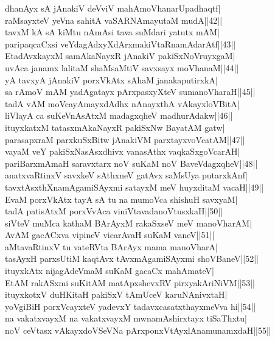 \documentclass{article}
\begin{document}
dhanAyx sA jAnakiV deVviV mahAmoVhanarUpadhaqtf|\\
raMsayxteV yeVna sahitA vaSARNAmayutaM mudA||42||\\
tavxM kA sA kiMtu nAmAsi tava suMdari yatutx mAM|\\
paripaqcaCxsi veYdagAdxyXdArxmakiVtaRnamAdarAtf||43||\\
EtadAvxkayxM samAkaNayxR jAnakiV pakiSxNoVruyxgaM|\\
uvAca janamx lalitaM shaMsaMtiV savxsayx moVhanaM||44||\\
yA tavxyA jAnakiV porxVkAtx sAhaM janakaputirxkA|\\
sa rAmoV mAM yadAgatayx pArxpasxyXteV sumanoVharaH||45||\\
tadA vAM moVcayAmayxdAdhx nAnayxthA vAkayxloVBitA|\\
liVlayA ca suKeVnAsAtxM madagxqheV madhurAdakw||46||\\
ituyxkatxM tatasxmAkaNayxR pakiSxNw BayatAM gatw|\\
parasapxraM parxkuSxBitw jAnakiVM parxtayxvoVcatAM||47||\\
vayaM veY pakiSxNasAsxdhivx vanasAthx vaqkaSxgoVcarAH|\\
pariBarxmAmaH saravxtarx noV suKaM noV BaveVdagxqheV||48||\\
anatxvaRtinxV savxkeV sAthxneV gatAvx saMsUya putarxkAnf|\\
tavxtAsxthXnamAgamiSAyxmi satayxM meV huyxditaM vacaH||49||\\
EvaM porxVkAtx tayA sA tu na mumoVca shishuH savxyaM|\\
tadA patisAtxM porxVvAca viniVtavadanoVtusxkaH||50||\\
siVteV muMca kathaM BArAyxM rakaSxseV meV manoVharAM|\\
AvAM gacACxva vipineV vicarAvaH suKaM vaneV||51||\\
aMtavaRtinxV tu vateRVta BArAyx mama manoVharA|\\
tasAyxH parxsUtiM kaqtAvx tAvxmAgamiSAyxmi shoVBaneV||52||\\
ituyxkAtx nijagAdeVmaM suKaM gacaCx mahAmateV|\\
EtAM rakASxmi suKitAM matApxshevxRV pirxyakAriNiVM||53||\\
ituyxkotxV duHKitaH pakiSxV tAmUceV karuNAnivxtaH|\\
yoVgiBiH porxVcayxteV yadevxY tadavxcasatxthayxmeVva hi||54||\\
na vakatxvayxM na vakatxvayxM mwnamAshirxtayx tiSaThxtu|\\
noV ceVtasx vAkayxdoVSeVNa pArxponxVtAyxlAnamunamxdaH||55||\\
\end{document}
